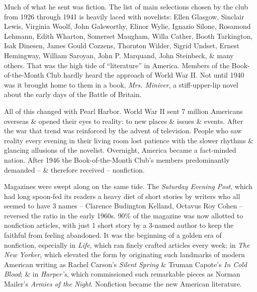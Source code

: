 \documentclass{article}
\begin{document}
Much of what he sent was fiction. The list of main selections chosen by the club from 1926 through 1941 is heavily laced with novelists: Ellen Glasgow, Sinclair Lewis, Virginia Woolf, John Galsworthy, Elinor Wylie, Ignazio Silone, Rosamond Lehmann, Edith Wharton, Somerset Maugham, Willa Cather, Booth Tarkington, Isak Dinesen, James Gould Cozzens, Thornton Wilder, Sigrid Undset, Ernest Hemingway, William Saroyan, John P. Marquand, John Steinbeck, \& many others. That was the high tide of ``literature'' in America. Members of the Book-of-the-Month Club hardly heard the approach of World War II. Not until 1940 was it brought home to them in a book, \textit{Mrs. Miniver}, a stiff-upper-lip novel about the early days of the Battle of Britain.

All of this changed with Pearl Harbor. World War II sent 7 million Americans overseas \& opened their eyes to reality: to new places \& issues \& events. After the war that trend was reinforced by the advent of television. People who saw reality every evening in their living room lost patience with the slower rhythms \& glancing allusions of the novelist. Overnight, America became a fact-minded nation. After 1946 the Book-of-the-Month Club's members predominantly demanded -- \& therefore received -- nonfiction.

Magazines were swept along on the same tide. The \textit{Saturday Evening Post}, which had long spoon-fed its readers a heavy diet of short stories by writers who all seemed to have 3 names -- Clarence Budington Kelland, Octavus Roy Cohen -- reversed the ratio in the early 1960s. 90\% of the magazine was now allotted to nonfiction articles, with just 1 short story by a 3-named author to keep the faithful from feeling abandoned. It was the beginning of a golden era of nonfiction, especially in \textit{Life}, which ran finely crafted articles every week; in \textit{The New Yorker}, which elevated the form by originating such landmarks of modern American writing as Rachel Carson's \textit{Silent Spring} \& Truman Capote's \textit{In Cold Blood}; \& in \textit{Harper's}, which commissioned such remarkable pieces as Norman Mailer's \textit{Armies of the Night}. Nonfiction became the new American literature.
\end{document}
